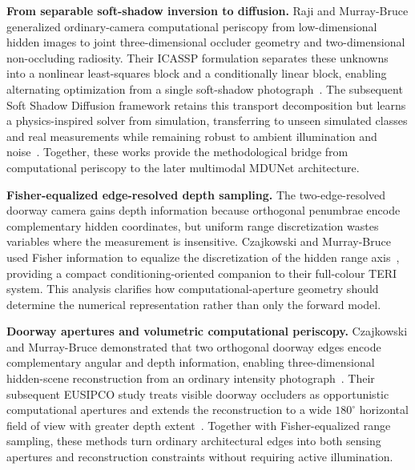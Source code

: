 \vspace{0.8mm}
\noindent \textbf{From separable soft-shadow inversion to diffusion.}
Raji and Murray-Bruce generalized ordinary-camera computational periscopy from low-dimensional hidden images to joint three-dimensional occluder geometry and two-dimensional non-occluding radiosity. Their ICASSP formulation separates these unknowns into a nonlinear least-squares block and a conditionally linear block, enabling alternating optimization from a single soft-shadow photograph~\cite{rajiSNLLSComputationalPersicopy2024}. The subsequent Soft Shadow Diffusion framework retains this transport decomposition but learns a physics-inspired solver from simulation, transferring to unseen simulated classes and real measurements while remaining robust to ambient illumination and noise~\cite{rajiSoftShadowDiffusion2024}. Together, these works provide the methodological bridge from computational periscopy to the later multimodal MDUNet architecture.

\vspace{0.8mm}
\noindent \textbf{Fisher-equalized edge-resolved depth sampling.}
The two-edge-resolved doorway camera gains depth information because orthogonal penumbrae encode complementary hidden coordinates, but uniform range discretization wastes variables where the measurement is insensitive. Czajkowski and Murray-Bruce used Fisher information to equalize the discretization of the hidden range axis~\cite{czajkowskiFisherTERI2024}, providing a compact conditioning-oriented companion to their full-colour TERI system. This analysis clarifies how computational-aperture geometry should determine the numerical representation rather than only the forward model.

\noindent \textbf{Doorway apertures and volumetric computational periscopy.}
Czajkowski and Murray-Bruce demonstrated that two orthogonal doorway edges encode complementary angular and depth information, enabling three-dimensional hidden-scene reconstruction from an ordinary intensity photograph~\cite{czajkowskiTwoEdgeResolved3DNLOS2024}. Their subsequent EUSIPCO study treats visible doorway occluders as opportunistic computational apertures and extends the reconstruction to a wide $180^\circ$ horizontal field of view with greater depth extent~\cite{czajkowskiVisibleOccludersNLOS2025}. Together with Fisher-equalized range sampling, these methods turn ordinary architectural edges into both sensing apertures and reconstruction constraints without requiring active illumination.

